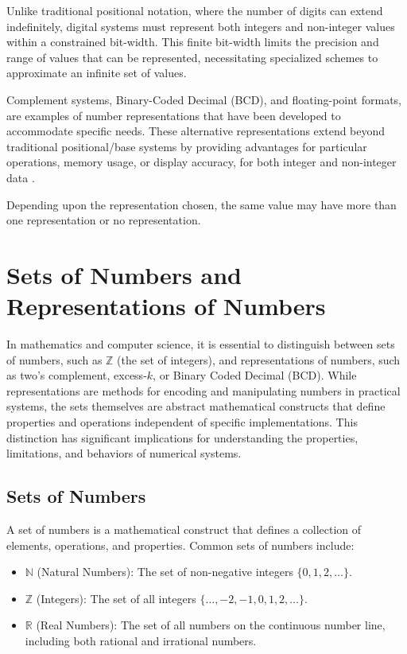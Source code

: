 Unlike traditional positional notation, where the number of digits can extend indefinitely, digital systems must represent both integers and non-integer values within a constrained bit-width. This finite bit-width limits the precision and range of values that can be represented, necessitating specialized schemes to approximate an infinite set of values.

Complement systems, Binary-Coded Decimal (BCD), and floating-point formats, are examples of number representations that have been developed to accommodate specific needs. These alternative representations extend beyond traditional positional/base systems by providing advantages for particular operations, memory usage, or display accuracy, for both integer and non-integer data \cite{knuth1997art, rosen2018, tanenbaum2013}. 

Depending upon the representation chosen, the same value may have more than one representation or no representation.

\section{Sets of Numbers and Representations of Numbers}
In mathematics and computer science, it is essential to distinguish between sets of numbers, such as \( \mathbb{Z} \) (the set of integers), and representations of numbers, such as two's complement, excess-\( k \), or Binary Coded Decimal (BCD). While representations are methods for encoding and manipulating numbers in practical systems, the sets themselves are abstract mathematical constructs that define properties and operations independent of specific implementations. This distinction has significant implications for understanding the properties, limitations, and behaviors of numerical systems.

\subsection{Sets of Numbers}
A set of numbers is a mathematical construct that defines a collection of elements, operations, and properties. Common sets of numbers include:

\begin{itemize}
    \item \( \mathbb{N} \) (Natural Numbers): The set of non-negative integers \( \{0, 1, 2, \dots\} \).
    \item \( \mathbb{Z} \) (Integers): The set of all integers \( \{\dots, -2, -1, 0, 1, 2, \dots\} \).
    \item \( \mathbb{R} \) (Real Numbers): The set of all numbers on the continuous number line, including both rational and irrational numbers.
\end{itemize}

